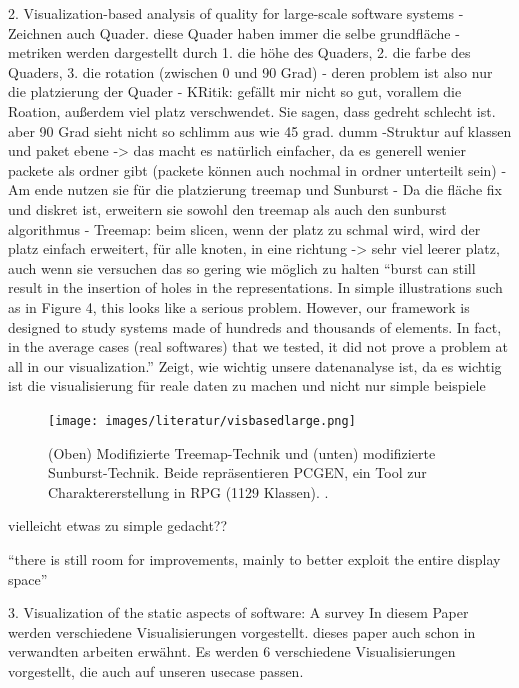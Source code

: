 2. Visualization-based analysis of quality for large-scale software systems \cite{visbasedlarge}
- Zeichnen auch Quader. diese Quader haben immer die selbe grundfläche
- metriken werden dargestellt durch 1. die höhe des Quaders, 2. die farbe des Quaders, 3. die rotation (zwischen 0 und 90 Grad) 
- deren problem ist also nur die platzierung der Quader
- KRitik: gefällt mir nicht so gut, vorallem die Roation, außerdem viel platz verschwendet. Sie sagen, dass gedreht schlecht ist. aber 90 Grad sieht nicht so schlimm aus wie 45 grad. dumm
-Struktur auf klassen und paket ebene -> das macht es natürlich einfacher, da es generell wenier packete als ordner gibt (packete können auch nochmal in ordner unterteilt sein)
- Am ende nutzen sie für die platzierung treemap und Sunburst
- Da die fläche fix und diskret ist, erweitern sie sowohl den treemap als auch den sunburst algorithmus
- Treemap: beim slicen, wenn der platz zu schmal wird, wird der platz einfach erweitert, für alle knoten, in eine richtung -> sehr viel leerer platz, auch wenn sie versuchen das so gering wie möglich zu halten
\enquote{burst can still result in the insertion of holes in the representations. In simple illustrations such as in Figure 4, this looks like a serious problem. However, our framework is designed to study systems made of hundreds and thousands of elements. In fact, in the average cases (real softwares) that we tested, it did not prove a problem at all in our visualization.}
Zeigt, wie wichtig unsere datenanalyse ist, da es wichtig ist die visualisierung für reale daten zu machen und nicht nur simple beispiele

\begin{figure}
    \centering
    \texttt{[image: images/literatur/visbasedlarge.png]}
    \caption{(Oben) Modifizierte Treemap-Technik und (unten) modifizierte Sunburst-Technik. Beide repräsentieren PCGEN, ein Tool zur Charaktererstellung in RPG (1129 Klassen). \cite[5]{visbasedlarge}.}
    \label{fig:visbasedlarge}
\end{figure}
vielleicht etwas zu simple gedacht??


\enquote{there is still room for improvements, mainly to better exploit the entire display space}\cite[8]{visbasedlarge}

3. Visualization of the static aspects of software: A survey \cite{staticSurvey}
In diesem Paper werden verschiedene Visualisierungen vorgestellt. dieses paper auch schon in verwandten arbeiten erwähnt.
Es werden 6 verschiedene Visualisierungen vorgestellt, die auch auf unseren usecase passen. 

